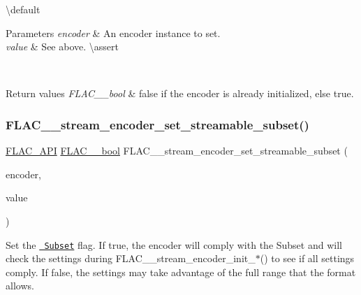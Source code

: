 \textbackslash{}default {} 
\begin{DoxyParams}{Parameters}
{\em encoder} & An encoder instance to set. \\
\hline
{\em value} & See above. \textbackslash{}assert 
\begin{DoxyCode}{1}
\end{DoxyCode}
 \\
\hline
\end{DoxyParams}

\begin{DoxyRetVals}{Return values}
{\em F\+L\+A\+C\+\_\+\+\_\+bool} & {\ttfamily false} if the encoder is already initialized, else {\ttfamily true}. \\
\hline
\end{DoxyRetVals}
\mbox{\label{group__flac__stream__encoder_ga163f1acfe8b6b8ae849f0f4f7c0708f4}} 
\subsubsection{\texorpdfstring{FLAC\_\_stream\_encoder\_set\_streamable\_subset()}{FLAC\_\_stream\_encoder\_set\_streamable\_subset()}}
{\footnotesize\ttfamily \mbox{\hyperlink{group__flac__export_ga56ca07df8a23310707732b1c0007d6f5}{F\+L\+A\+C\+\_\+\+A\+PI}} \mbox{\hyperlink{ordinals_8h_a95103469f1cbd78b8cf250194985b34e}{F\+L\+A\+C\+\_\+\+\_\+bool}} F\+L\+A\+C\+\_\+\+\_\+stream\+\_\+encoder\+\_\+set\+\_\+streamable\+\_\+subset (\begin{DoxyParamCaption}\item[{\mbox{\hyperlink{struct_f_l_a_c_____stream_encoder}{F\+L\+A\+C\+\_\+\+\_\+\+Stream\+Encoder}} $\ast$}]{encoder,  }\item[{\mbox{\hyperlink{ordinals_8h_a95103469f1cbd78b8cf250194985b34e}{F\+L\+A\+C\+\_\+\+\_\+bool}}}]{value }\end{DoxyParamCaption})}

Set the \href{../format.html\#subset}{\texttt{ Subset}} flag. If {\ttfamily true}, the encoder will comply with the Subset and will check the settings during F\+L\+A\+C\+\_\+\+\_\+stream\+\_\+encoder\+\_\+init\+\_\+$\ast$() to see if all settings comply. If {\ttfamily false}, the settings may take advantage of the full range that the format allows.

